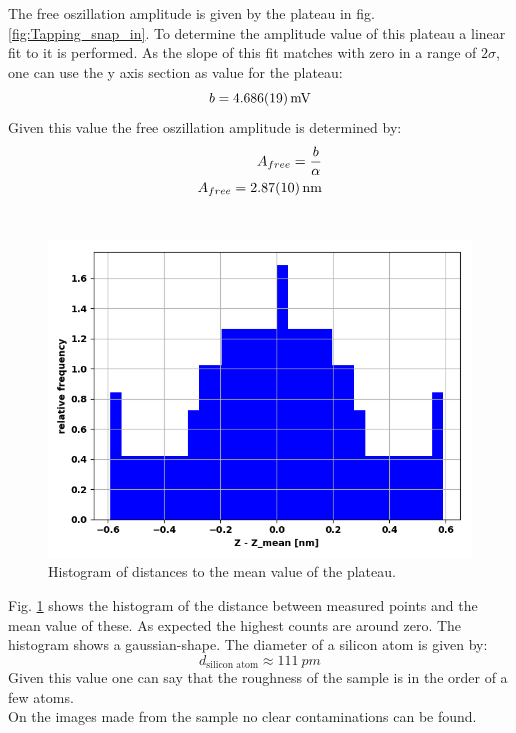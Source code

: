 \documentclass[%
 reprint,
amsmath,amssymb,
pra,
]{revtex4-1}
\begin{document}
The free oszillation amplitude is given by the plateau in fig. \ref{fig:Tapping_snap_in}. To determine the amplitude value of this plateau a linear fit to it is performed. As the slope of this fit matches with zero in a range of $2 \sigma$, one can use the y axis section as value for the plateau:
\begin{equation*}
b = \SI{4.686 \pm 0.019}{mV}
\end{equation*}
Given this value the free oszillation amplitude is determined by:
\begin{equation*}
\begin{aligned}
A_{free} = \dfrac{b}{\alpha}\\
A_{free} = \SI{2.87 \pm 0.10}{nm}
\end{aligned}
\end{equation*} \\

\begin{figure}
\centering
\includegraphics[scale=0.5]{Bilder/Tapping_Mode/Roughness_histogram.PNG}
\caption{Histogram of distances to the mean value of the plateau.}
\label{fig:Roughness_histogram}
\end{figure}

Fig. \ref{fig:Roughness_histogram} shows the histogram of the distance between measured points and the mean value of these. As expected the highest counts are around zero. The histogram shows a gaussian-shape. The diameter of a silicon atom is given by:
\begin{equation*}
d_{\text{silicon atom}} \approx \SI{111}{pm}
\end{equation*}
Given this value one can say that the roughness of the sample is in the order of a few atoms. \\
On the images made from the sample no clear contaminations can be found.
\end{document}
